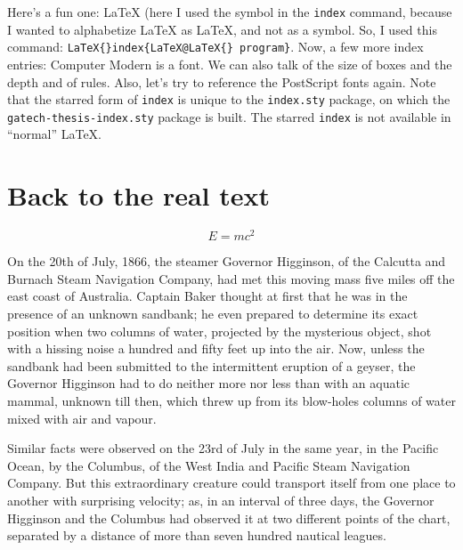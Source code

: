 Here's a fun one: \LaTeX{} (here I 
used the \@ symbol in the \texttt{\bs{}index} command, because I 
wanted to alphabetize \LaTeX{} as LaTeX, and not as a symbol.  
So, I used this command:
\texttt{\bs{}LaTeX\{\}\linebreak[0]{}\bs{}index\{\linebreak[0]{}LaTeX@\linebreak[0]{}\bs{}LaTeX\{\} program\}}.
Now, a few more index entries: Computer Modern
is a font.  We can also talk of the size of boxes
and the depth and  of rules.  Also,
let's try to reference the PostScript fonts again.
Note that the starred form of \texttt{\bs{}index} is unique to the 
\texttt{index.sty} package, on which the \texttt{gatech-thesis-index.sty} 
package is built.  The starred \texttt{\bs{}index} is not available in 
``normal'' \LaTeX.

\section{Back to the real text}

\begin{equation}
E=mc^2
\end{equation}

On the 20th of July, 1866, the steamer Governor Higginson,
of the Calcutta and Burnach Steam Navigation Company, had met
this moving mass five miles off the east coast of Australia.
Captain Baker thought at first that he was in the presence of an
unknown sandbank; he even prepared to determine its exact position
when two columns of water, projected by the mysterious object,
shot with a hissing noise a hundred and fifty feet up into the air.
Now, unless the sandbank had been submitted to the intermittent
eruption of a geyser, the Governor Higginson had to do neither
more nor less than with an aquatic mammal, unknown till then,
which threw up from its blow-holes columns of water mixed with
air and vapour.\cite{inbook-full}\cite{book-full}

Similar facts were observed on the 23rd of July in the same year,
in the Pacific Ocean, by the Columbus, of the West India
and Pacific Steam Navigation Company.  But this extraordinary
creature could transport itself from one place to another
with surprising velocity; as, in an interval of three days,
the Governor Higginson and the Columbus had observed it at
two different points of the chart, separated by a distance
of more than seven hundred nautical leagues.

